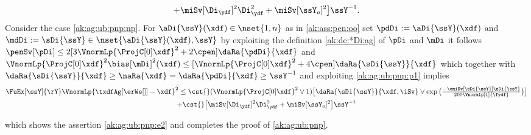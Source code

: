 \begin{pro}
\begin{multline}
  +\miSv[\Di_{\ydf}]^2\Di_{\ydf}^2+\miSv[\ssY_{o}]^2 \big]\ssY^{-1}.
\end{multline}
Consider the case \ref{ak:ag:ub:pnp:np}. For $\aDi{\ssY}(\xdf)\in\nset{1,n}$
as in \ref{ak:ass:pen:oo}  set $\pdDi:=\aDi{\ssY}(\xdf)$ and $\mdDi:=\sDi{\ssY}\in\nset{\aDi{\ssY}(\xdf),\ssY}$ by exploiting the definition
\eqref{ak:de:*Di:ag} of $\pDi$ and $\mDi$ it follows
$\penSv[\pDi] \leq 2[3\VnormLp{\ProjC[0]\xdf}^2+ 2\cpen]
\daRa{\pdDi}{\xdf}$ and 
$\VnormLp{\ProjC[0]\xdf}^2\bias[\mDi]^2(\xdf)\leq
      [\VnormLp{\ProjC[0]\xdf}^2+4\cpen]\daRa{\sDi{\ssY}}{\xdf}$
which together with
$\daRa{\sDi{\ssY}}{\xdf}\geq\naRa{\xdf}=\daRa{\pdDi}{\xdf}\geq\ssY^{-1}$
and exploiting 
\eqref{ak:ag:ub:pnp:p1} implies%
 \begin{multline}\label{ak:ag:ub:pnp:p8}
   \FuEx[\ssY]{\rY}\VnormLp{\txdfAg[{\erWe[]}]-\xdf}^2%
    \leq 
   \cst{}(\VnormLp{\ProjC[0]\xdf}^2\vee1)\big[\daRa{\sDi{\ssY}}{\xdf,\iSv}\vee\exp\big(\tfrac{-\cmiSv[\sDi{\ssY}]\sDi{\ssY}}{200\Vnormlp[1]{\fydf}}\big)\big]\\
   +\cst{}\big[\miSv[\Di_{\ydf}]^2\Di_{\ydf}^2+\miSv[\ssY_{o}]^2 \big]\ssY^{-1}
\end{multline}

which shows the assertion \eqref{ak:ag:ub:pnp:e2} and  completes the
proof of \cref{ak:ag:ub:pnp}.\proEnd\end{pro}
